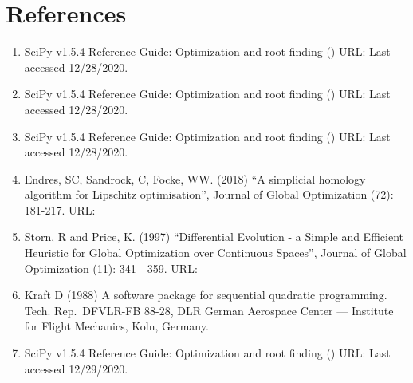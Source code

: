 \documentclass[letterpaper,10pt,english]{sphinxmanual}
\begin{document}
\section{References}
\label{\detokenize{optimizers:references}}\begin{enumerate}
\def\theenumi{\arabic{enumi}}
\def\labelenumi{\theenumi .}
\makeatletter\def\p@enumii{\p@enumi \theenumi .}\makeatother
\item {} 
 SciPy v1.5.4 Reference Guide: Optimization
and root finding () URL:
Last accessed 12/28/2020.

\item {} 
 SciPy v1.5.4 Reference
Guide: Optimization and root finding () URL:
Last accessed 12/28/2020.

\item {} 
 SciPy v1.5.4 Reference Guide:
Optimization and root finding () URL:
Last accessed 12/28/2020.

\item {} 
Endres, SC, Sandrock, C, Focke, WW. (2018) “A simplicial homology
algorithm for Lipschitz optimisation”, Journal of Global Optimization
(72): 181-217. URL:

\item {} 
Storn, R and Price, K. (1997) “Differential Evolution - a Simple and
Efficient Heuristic for Global Optimization over Continuous Spaces”,
Journal of Global Optimization (11): 341 - 359. URL:

\item {} 
Kraft D (1988) A software package for sequential quadratic
programming. Tech. Rep. DFVLR-FB 88-28, DLR German Aerospace Center —
Institute for Flight Mechanics, Koln, Germany.

\item {} 
 SciPy v1.5.4 Reference Guide:
Optimization and root finding () URL:
Last accessed 12/29/2020.

\end{enumerate}
\end{document}
